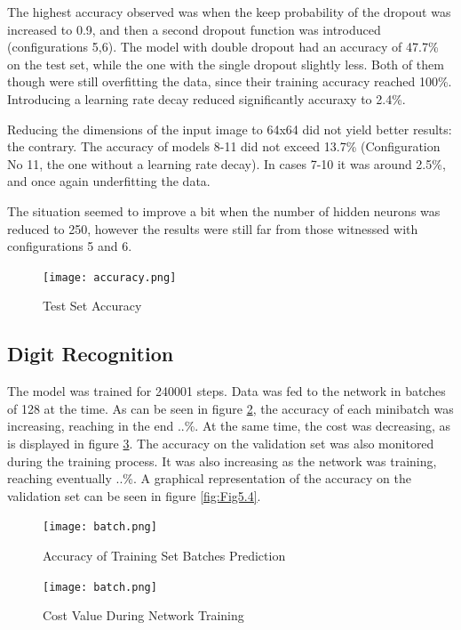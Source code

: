 \documentclass[final,12p,times]{elsarticle}
\begin{document}
\begin{Itemize}
The highest accuracy observed was when the keep probability of the dropout was increased to 0.9, and then a second dropout function was introduced (configurations 5,6).
The model with double dropout had an accuracy of 47.7\% on the test set, while the one with the single dropout slightly less.
Both of them though were still overfitting the data, since their training accuracy reached 100\%.
Introducing a learning rate decay reduced significantly accuraxy to 2.4\%.

Reducing the dimensions of the input image to 64x64 did not yield better results: the contrary.
The accuracy of models 8-11 did not exceed 13.7\% (Configuration No 11, the one without a learning rate decay).
In cases 7-10 it was around 2.5\%, and once again underfitting the data. 

The situation seemed to improve a bit when the number of hidden neurons was reduced to 250, however the results were still far from 
those witnessed with configurations 5 and 6.


\begin{figure}[H]
  \texttt{[image: accuracy.png]}
  \caption{Test Set Accuracy}
  \label{fig:Fig5.1}
  \end{figure}

\subsection{Digit Recognition}
\label{sec:5.1.2}
The model was trained for 240001 steps.
Data was fed to the network in batches of 128 at the time.
As can be seen in figure \ref{fig:Fig5.2}, the accuracy of each minibatch was increasing, reaching in the end ..\%.
At the same time, the cost was decreasing, as is displayed in figure \ref{fig:Fig5.3}.
The accuracy on the validation set was also monitored during the training process.
It was also increasing as the network was training, reaching eventually ..\%.
A graphical representation of the accuracy on the validation set can be seen in figure \ref{fig:Fig5.4}.


\begin{figure}[H]
  \texttt{[image: batch.png]}
  \caption{Accuracy of Training Set Batches Prediction}
  \label{fig:Fig5.2}
  \end{figure}
  
  \begin{figure}[H]
  \texttt{[image: batch.png]}
  \caption{Cost Value During Network Training}
  \label{fig:Fig5.3}
  \end{figure}



\end{Itemize}
\end{document}
